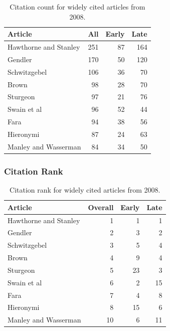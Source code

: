 \documentclass[
  10pt,
  letterpaper,
  DIV=11,
  numbers=noendperiod,
  twoside]{scrartcl}
\begin{document}
\begin{longtable}[]{@{}lrrr@{}}

\caption{\label{tbl-citation-count-2008}Citation count for widely cited
articles from 2008.}

\tabularnewline

\toprule\noalign{}
Article & All & Early & Late \\
\midrule\noalign{}
\endhead
\bottomrule\noalign{}
\endlastfoot
Hawthorne and Stanley & 251 & 87 & 164 \\
Gendler & 170 & 50 & 120 \\
Schwitzgebel & 106 & 36 & 70 \\
Brown & 98 & 28 & 70 \\
Sturgeon & 97 & 21 & 76 \\
Swain et al & 96 & 52 & 44 \\
Fara & 94 & 38 & 56 \\
Hieronymi & 87 & 24 & 63 \\
Manley and Wasserman & 84 & 34 & 50 \\

\end{longtable}

\subsubsection*{Citation Rank}\label{sec-rank-2008}

\begin{longtable}[]{@{}lrrr@{}}

\caption{\label{tbl-citation-rank-2008}Citation rank for widely cited
articles from 2008.}

\tabularnewline

\toprule\noalign{}
Article & Overall & Early & Late \\
\midrule\noalign{}
\endhead
\bottomrule\noalign{}
\endlastfoot
Hawthorne and Stanley & 1 & 1 & 1 \\
Gendler & 2 & 3 & 2 \\
Schwitzgebel & 3 & 5 & 4 \\
Brown & 4 & 9 & 4 \\
Sturgeon & 5 & 23 & 3 \\
Swain et al & 6 & 2 & 15 \\
Fara & 7 & 4 & 8 \\
Hieronymi & 8 & 15 & 6 \\
Manley and Wasserman & 10 & 6 & 11 \\

\end{longtable}
\end{document}
